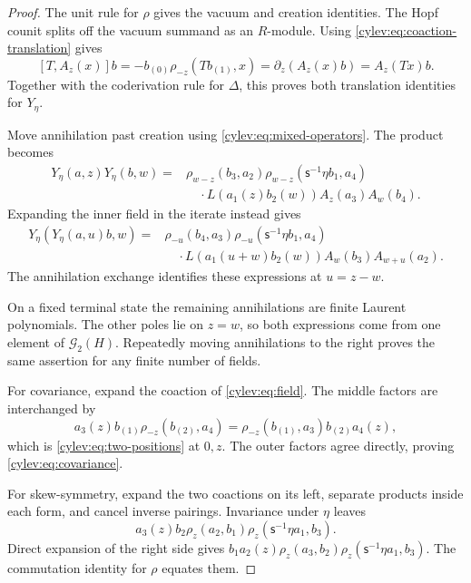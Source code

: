 \begin{proof}
The unit rule for $\rho$ gives the vacuum and creation identities.
The Hopf counit splits off the vacuum summand as an $R$-module.
Using \eqref{cylev:eq:coaction-translation} gives
\[
 [T,A_z(x)]b=-b_{(0)}\rho_{-z}(Tb_{(1)},x)
       =\partial_z(A_z(x)b)=A_z(Tx)b.
\]
Together with the coderivation rule for $\Delta$, this proves both
translation identities for $Y_\eta$.

Move annihilation past creation using
\eqref{cylev:eq:mixed-operators}. The product becomes
\begin{equation}\label{cylev:eq:normal-product}
\begin{split}
 Y_\eta(a,z)Y_\eta(b,w)
 ={}&\rho_{w-z}(b_3,a_2)
       \rho_{w-z}(\mathsf s^{-1}\eta b_1,a_4)\\
 &\quad\cdot L(a_1(z)b_2(w))A_z(a_3)A_w(b_4).
\end{split}
\end{equation}
Expanding the inner field in the iterate instead gives
\begin{equation}\label{cylev:eq:normal-iterate}
\begin{split}
 Y_\eta(Y_\eta(a,u)b,w)
 ={}&\rho_{-u}(b_4,a_3)
       \rho_{-u}(\mathsf s^{-1}\eta b_1,a_4)\\
 &\quad\cdot L(a_1(u+w)b_2(w))A_w(b_3)A_{w+u}(a_2).
\end{split}
\end{equation}
The annihilation exchange identifies these expressions at $u=z-w$.

On a fixed terminal state the remaining annihilations are finite
Laurent polynomials. The other poles lie on $z=w$, so both expressions
come from one element of $\mathcal G_2(H)$.
Repeatedly moving annihilations to the right proves the same assertion
for any finite number of fields.

For covariance, expand the coaction of \eqref{cylev:eq:field}.
The middle factors are interchanged by
\[
 a_3(z)b_{(1)}\rho_{-z}(b_{(2)},a_4)
       =\rho_{-z}(b_{(1)},a_3)b_{(2)}a_4(z),
\]
which is \eqref{cylev:eq:two-positions} at $0,z$.
The outer factors agree directly, proving \eqref{cylev:eq:covariance}.

For skew-symmetry, expand the two coactions on its left, separate
products inside each form, and cancel inverse pairings.
Invariance under $\eta$ leaves
\[
 a_3(z)b_2\rho_z(a_2,b_1)
                  \rho_z(\mathsf s^{-1}\eta a_1,b_3).
\]
Direct expansion of the right side gives
$b_1a_2(z)\rho_z(a_3,b_2)\rho_z(\mathsf s^{-1}\eta a_1,b_3)$.
The commutation identity for $\rho$ equates them.


\end{proof}
